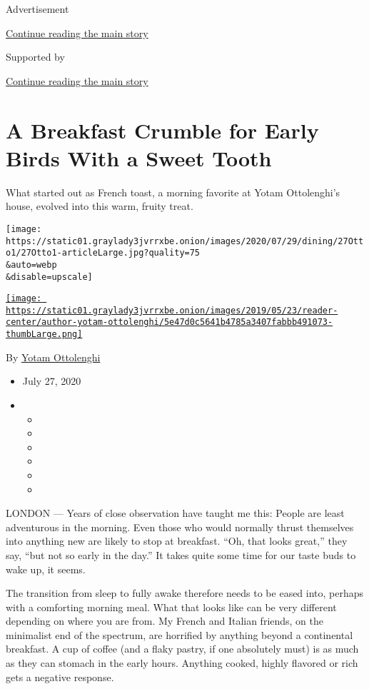 Advertisement

\protect\hyperlink{after-top}{Continue reading the main story}

Supported by

\protect\hyperlink{after-sponsor}{Continue reading the main story}

\hypertarget{a-breakfast-crumble-for-early-birds-with-a-sweet-tooth}{%
\section{A Breakfast Crumble for Early Birds With a Sweet
Tooth}\label{a-breakfast-crumble-for-early-birds-with-a-sweet-tooth}}

What started out as French toast, a morning favorite at Yotam
Ottolenghi's house, evolved into this warm, fruity treat.

\texttt{[image: https://static01.graylady3jvrrxbe.onion/images/2020/07/29/dining/27Otto1/27Otto1-articleLarge.jpg?quality=75\\\&auto=webp\\\&disable=upscale]}

\href{https://www.nytimes3xbfgragh.onion/by/yotam-ottolenghi}{\texttt{[image: https://static01.graylady3jvrrxbe.onion/images/2019/05/23/reader-center/author-yotam-ottolenghi/5e47d0c5641b4785a3407fabbb491073-thumbLarge.png]}}

By \href{https://www.nytimes3xbfgragh.onion/by/yotam-ottolenghi}{Yotam
Ottolenghi}

\begin{itemize}
\item
  July 27, 2020
\item
  \begin{itemize}
  \item
  \item
  \item
  \item
  \item
  \item
  \end{itemize}
\end{itemize}

LONDON --- Years of close observation have taught me this: People are
least adventurous in the morning. Even those who would normally thrust
themselves into anything new are likely to stop at breakfast. ``Oh, that
looks great,'' they say, ``but not so early in the day.'' It takes quite
some time for our taste buds to wake up, it seems.

The transition from sleep to fully awake therefore needs to be eased
into, perhaps with a comforting morning meal. What that looks like can
be very different depending on where you are from. My French and Italian
friends, on the minimalist end of the spectrum, are horrified by
anything beyond a continental breakfast. A cup of coffee (and a flaky
pastry, if one absolutely must) is as much as they can stomach in the
early hours. Anything cooked, highly flavored or rich gets a negative
response.

